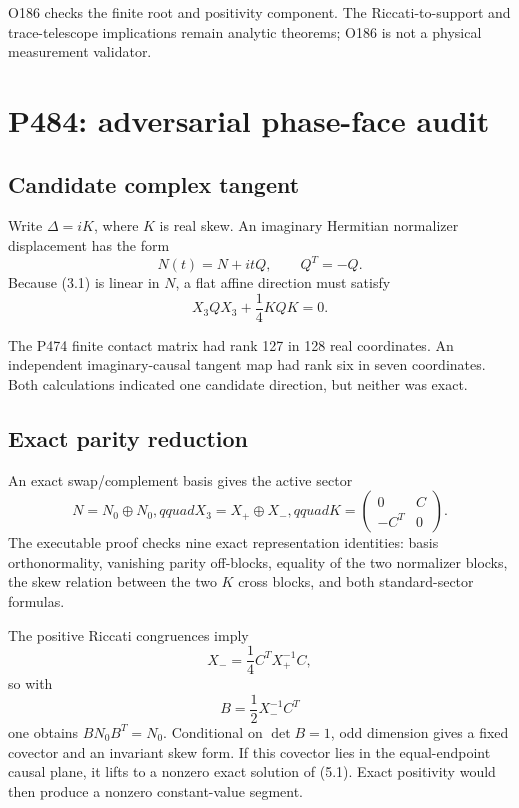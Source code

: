 \documentclass[11pt,a4paper,openany]{report}
\begin{document}
O186 checks the finite root and positivity component. The
Riccati-to-support and trace-telescope implications remain analytic theorems;
O186 is not a physical measurement validator.

\chapter{P484: adversarial phase-face audit}

\section{Candidate complex tangent}

Write \(\Delta=iK\), where \(K\) is real skew. An imaginary Hermitian
normalizer displacement has the form
\[
 N(t)=N+i tQ,\qquad Q^T=-Q.
\]
Because (3.1) is linear in \(N\), a flat affine direction must satisfy
\[
 X_3QX_3+\frac14KQK=0.                                             \tag{5.1}
\]

The P474 finite contact matrix had rank 127 in 128 real coordinates. An
independent imaginary-causal tangent map had rank six in seven coordinates.
Both calculations indicated one candidate direction, but neither was exact.

\section{Exact parity reduction}

An exact swap/complement basis gives the active sector
\[
 N=N_0\oplus N_0,qquad
 X_3=X_+\oplus X_-,qquad
 K=\begin{pmatrix}0&C\\-C^T&0\end{pmatrix}.                       \tag{5.2}
\]
The executable proof checks nine exact representation identities: basis
orthonormality, vanishing parity off-blocks, equality of the two normalizer
blocks, the skew relation between the two \(K\) cross blocks, and both
standard-sector formulas.

The positive Riccati congruences imply
\[
 X_- = \frac14 C^T X_+^{-1} C,                                    \tag{5.3}
\]
so with
\[
 B=\frac12X_-^{-1}C^T
\]
one obtains \(BN_0B^T=N_0\). Conditional on \(\det B=1\), odd dimension
gives a fixed covector and an invariant skew form. If this covector lies in
the equal-endpoint causal plane, it lifts to a nonzero exact solution of
(5.1). Exact positivity would then produce a nonzero constant-value segment.
\end{document}
